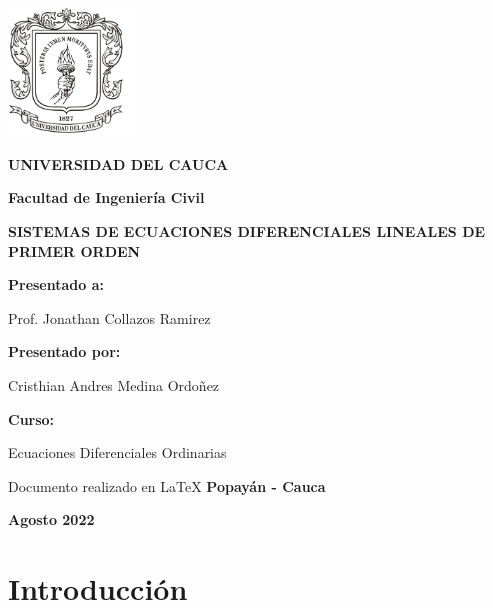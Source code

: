 \documentclass[titlepage]{article}
\begin{document}
   
    \begin{titlepage}
    
        \centering
        \includegraphics[width=0.25\textwidth]{EmblemaUnicauca}\par\vspace{1cm}
        \textbf{\LARGE UNIVERSIDAD DEL CAUCA}\par\vspace{1cm}
        \textbf{\Large Facultad de Ingeniería Civil}\par\vspace{1cm}
        \textbf{\Large SISTEMAS DE ECUACIONES DIFERENCIALES LINEALES DE PRIMER ORDEN}\par\vspace{1cm} 
        \textbf{\Large Presentado a:}\par\vspace{0.5cm}
        \large Prof. Jonathan Collazos Ramirez\par\vspace{1cm}
        \textbf{\Large Presentado por:}\par\vspace{0.5cm}
        \large Cristhian Andres Medina Ordoñez\par\vspace{1cm}
        \textbf{\Large Curso:}\par\vspace{0.5cm}
        \large Ecuaciones Diferenciales Ordinarias \par\vspace{1cm}
        Documento realizado en \LaTeX
        \vfill
        \textbf{\large Popayán - Cauca}\par
        \textbf{\large Agosto 2022} 
        
    \end{titlepage}
    
    \tableofcontents
    
    \vfill
    
    \section{Introducción}
    
\end{document}
